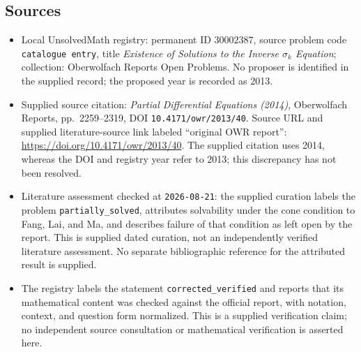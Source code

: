 \documentclass[11pt]{article}
\begin{document}
\subsection{Sources}
\begin{itemize}
\item Local UnsolvedMath registry: permanent ID \(30002387\), source problem code \texttt{catalogue entry}, title \emph{Existence of Solutions to the Inverse \(\sigma_k\) Equation}; collection: Oberwolfach Reports Open Problems. No proposer is identified in the supplied record; the proposed year is recorded as 2013.
\item Supplied source citation: \emph{Partial Differential Equations (2014)}, Oberwolfach Reports, pp.~2259--2319, DOI \texttt{10.4171/owr/2013/40}. Source URL and supplied literature-source link labeled ``original OWR report'': \url{https://doi.org/10.4171/owr/2013/40}. The supplied citation uses 2014, whereas the DOI and registry year refer to 2013; this discrepancy has not been resolved.
\item Literature assessment checked at \texttt{2026-08-21}: the supplied curation labels the problem \texttt{partially\_solved}, attributes solvability under the cone condition to Fang, Lai, and Ma, and describes failure of that condition as left open by the report. This is supplied dated curation, not an independently verified literature assessment. No separate bibliographic reference for the attributed result is supplied.
\item The registry labels the statement \texttt{corrected\_verified} and reports that its mathematical content was checked against the official report, with notation, context, and question form normalized. This is a supplied verification claim; no independent source consultation or mathematical verification is asserted here.
\end{itemize}
\end{document}
